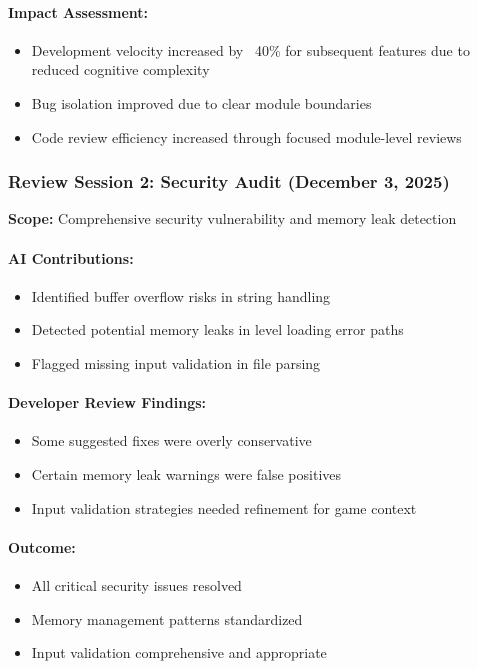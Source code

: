\documentclass[12pt,a4paper]{article}
\begin{document}
\paragraph{Impact Assessment:}
\begin{itemize}
    \item Development velocity increased by ~40\% for subsequent features due to reduced cognitive complexity
    \item Bug isolation improved due to clear module boundaries
    \item Code review efficiency increased through focused module-level reviews
\end{itemize}

\subsubsection{Review Session 2: Security Audit (December 3, 2025)}

\textbf{Scope:} Comprehensive security vulnerability and memory leak detection

\paragraph{AI Contributions:}
\begin{itemize}
    \item Identified buffer overflow risks in string handling
    \item Detected potential memory leaks in level loading error paths
    \item Flagged missing input validation in file parsing
\end{itemize}

\paragraph{Developer Review Findings:}
\begin{itemize}
    \item Some suggested fixes were overly conservative
    \item Certain memory leak warnings were false positives
    \item Input validation strategies needed refinement for game context
\end{itemize}

\paragraph{Outcome:}
\begin{itemize}
    \item All critical security issues resolved
    \item Memory management patterns standardized
    \item Input validation comprehensive and appropriate
\end{itemize}
\end{document}
